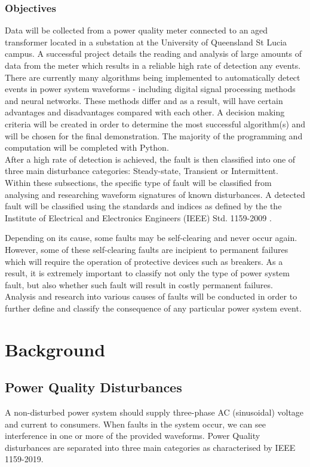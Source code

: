 \documentclass[12pt]{article}
\begin{document}
\subsubsection{Objectives}
Data will be collected from a power quality meter connected to an aged transformer located in a substation at the University of Queensland St Lucia campus. A successful project details the reading and analysis of large amounts of data from the meter which results in a reliable high rate of detection any events. There are currently many algorithms being implemented to automatically detect events in power system waveforms - including digital signal processing methods and neural networks. These methods differ and as a result, will have certain advantages and disadvantages compared with each other. A decision making criteria will be created in order to determine the most successful algorithm(s) and will be chosen for the final demonstration. The majority of the programming and computation will be completed with Python.\newline
\\
After a high rate of detection is achieved, the fault is then classified into one of three main disturbance categories: Steady-state, Transient or Intermittent. Within these subsections, the specific type of fault will be classified from analysing and researching waveform signatures of known disturbances. A detected fault will be classified using the standards and indices as defined by the the Institute of Electrical and Electronics Engineers (IEEE) Std. 1159-2009 \cite{PQ}.   

Depending on its cause, some faults may be self-clearing and never occur again. However, some of these self-clearing faults are incipient to permanent failures which will require the operation of protective devices such as breakers. As a result, it is extremely important to classify not only the type of power system fault, but also whether such fault will result in costly permanent failures. Analysis and research into various causes of faults will be conducted in order to further define and classify the consequence of any particular power system event. 



\newpage 
\section{Background}
\subsection{Power Quality Disturbances} 
A non-disturbed power system should supply three-phase AC (sinusoidal) voltage and current to consumers. When faults in the system occur, we can see interference in one or more of the provided waveforms. Power Quality disturbances are separated into three main categories as characterised by IEEE 1159-2019\cite{PQ}.
\end{document}
